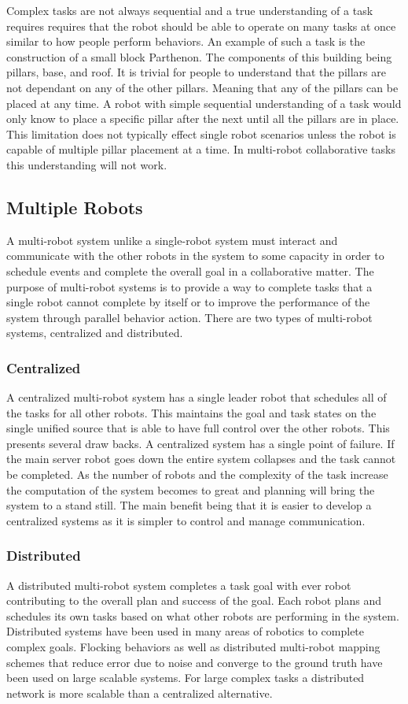 \documentclass[conference]{IEEEtran}
\begin{document}
Complex tasks are not always sequential and a true understanding of a task requires requires that the robot should be able to operate on many tasks at once similar to how people perform behaviors. An example of such a task is the construction of a small block Parthenon. The components of this building being pillars, base, and roof. It is trivial for people to understand that the pillars are not dependant on any of the other pillars. Meaning that any of the pillars can be placed at any time. A robot with simple sequential understanding of a task would only know to place a specific pillar after the next until all the pillars are in place. This limitation does not typically effect single robot scenarios unless the robot is capable of multiple pillar placement at a time. In multi-robot collaborative tasks this understanding will not work.

\subsection{Multiple Robots}
A multi-robot system unlike a single-robot system must interact and communicate with the other robots in the system to some capacity in order to schedule events and complete the overall goal in a collaborative matter. The purpose of multi-robot systems is to provide a way to complete tasks that a single robot cannot complete by itself or to improve the performance of the system through parallel behavior action. There are two types of multi-robot systems, centralized and distributed.

\subsubsection{Centralized}
A centralized multi-robot system has a single leader robot that schedules all of the tasks for all other robots. This maintains the goal and task states on the single unified source that is able to have full control over the other robots. This presents several draw backs. A centralized system has a single point of failure. If the main server robot goes down the entire system collapses and the task cannot be completed. As the number of robots and the complexity of the task increase the computation of the system becomes to great and planning will bring the system to a stand still. The main benefit being that it is easier to develop a centralized systems as it is simpler to control and manage communication.

\subsubsection{Distributed}
A distributed multi-robot system completes a task goal with ever robot contributing to the overall plan and success of the goal. Each robot plans and schedules its own tasks based on what other robots are performing in the system. Distributed systems have been used in many areas of robotics to complete complex goals. Flocking behaviors as well as distributed multi-robot mapping schemes that reduce error due to noise and converge to the ground truth have been used on large scalable systems. For large complex tasks a distributed network is more scalable than a centralized alternative.
\end{document}
